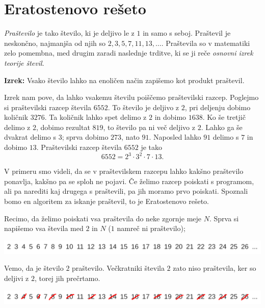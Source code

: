 \documentclass{book}
\begin{document}
\section{Eratostenovo rešeto}

\emph{Praštevilo} je tako število, ki je deljivo le z $1$ in samo s seboj.
Praštevil je neskončno, najmanjša od njih so $2, 3, 5, 7, 11, 13, \ldots$.
Praštevila so v matematiki zelo pomembna, med drugim zaradi naslednje trditve,
ki se ji reče \emph{osnovni izrek teorije števil}.

\vspace{0.5cm}

\textbf{Izrek:} Vsako število lahko na enoličen način zapišemo kot produkt
praštevil.

\begin{examples}
  Izrek nam pove, da lahko vsakemu številu poiščemo praštevilski razcep.
  Poglejmo si praštevilski razcep števila $6552$.
  To število je deljivo z $2$, pri deljenju dobimo količnik $3276$.
  Ta količnik lahko spet delimo z $2$ in dobimo $1638$.
  Ko še tretjič delimo z $2$, dobimo rezultat $819$, to število pa ni več
  deljivo z $2$.
  Lahko ga še dvakrat delimo s $3$; sprva dobimo $273$, nato $91$.
  Naposled lahko $91$ delimo s $7$ in dobimo $13$.
  Praštevilski razcep števila $6552$ je tako
  \[
	6552 = 2^3 \cdot 3^2 \cdot 7 \cdot 13.
  \]
\end{examples}

V primeru smo videli, da se v praštevilskem razcepu lahko kakšno praštevilo
ponavlja, kakšno pa se sploh ne pojavi.
Če želimo razcep poiskati s programom, ali pa narediti kaj drugega s praštevili,
pa jih moramo prvo poiskati.
Spoznali bomo en algoritem za iskanje praštevil, to je Eratostenovo rešeto.

Recimo, da želimo poiskati vsa praštevila do neke zgornje meje $N$.
Sprva si napišemo vsa števila med $2$ in $N$ ($1$ namreč ni praštevilo);

\includegraphics[width=\linewidth]{chapters/teorija-stevil/slike/reseto1}

Vemo, da je število $2$ praštevilo.
Večkratniki števila $2$ zato niso praštevila, ker so deljivi z $2$, torej jih
prečrtamo.

\includegraphics[width=\linewidth]{chapters/teorija-stevil/slike/reseto2}
\end{document}
